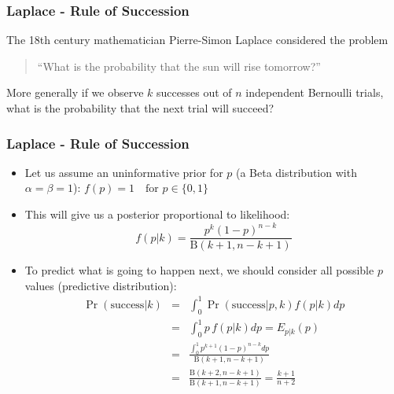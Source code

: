 \documentclass[ignorenonframetext]{beamer}
\begin{document}
\begin{frame}\frametitle{Laplace - Rule of Succession}
The 18th century mathematician Pierre-Simon Laplace considered the
problem \begin{quote}
``What is the probability that the sun will rise tomorrow?''
\end{quote}
More generally if we observe $k$ successes out of $n$ independent
Bernoulli trials, what is the probability that the next trial will
succeed?
\end{frame}

\begin{frame}\frametitle{Laplace - Rule of Succession}
\begin{itemize}
\item Let us assume an uninformative prior for $p$ (a Beta
  distribution with $\alpha=\beta=1$):
$f(p) = 1 \!\quad \text{for }p\in\{0,1\}$
\item This will give us a posterior proportional to likelihood: \[
f(p|k) = \frac{p^k(1-p)^{n-k}}{\mbox{B}(k+1,n-k+1)}
\]
\item To predict what is going to happen next, we should consider all
  possible $p$ values (predictive distribution): \begin{eqnarray*}
\Pr(\mbox{success}|k) &=& \int_0^1 \Pr(\mbox{success}|p,k) f(p|k) dp \\
&=& \int_0^1 p\, f(p|k) dp = E_{p|k}(p)\\
&=& \frac{\int_0^1 p^{k+1}(1-p)^{n-k} dp}{\mbox{B}(k+1,n-k+1)} \\
&=& \frac{\mbox{B}(k+2,n-k+1)}{\mbox{B}(k+1,n-k+1)} = \frac{k+1}{n+2}\\
\end{eqnarray*}
\end{itemize}
\end{frame}
\end{document}

